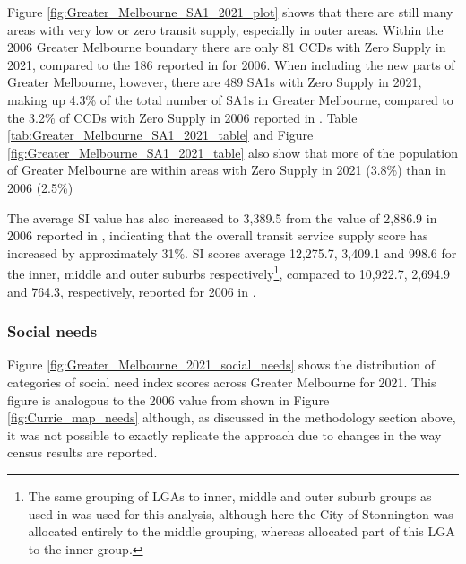 \documentclass[preprint, 3p,
authoryear]{elsarticle} %
\begin{document}
Figure \ref{fig:Greater_Melbourne_SA1_2021_plot} shows that there are
still many areas with very low or zero transit supply, especially in
outer areas. Within the 2006 Greater Melbourne boundary there are only
81 CCDs with Zero Supply in 2021, compared to the 186 reported in
\citet{currie2010identifying} for 2006. When including the new parts of
Greater Melbourne, however, there are 489 SA1s with Zero Supply in 2021,
making up 4.3\% of the total number of SA1s in Greater Melbourne,
compared to the 3.2\% of CCDs with Zero Supply in 2006 reported in
\citet{currie2010identifying}. Table
\ref{tab:Greater_Melbourne_SA1_2021_table} and Figure
\ref{fig:Greater_Melbourne_SA1_2021_table} also show that more of the
population of Greater Melbourne are within areas with Zero Supply in
2021 (3.8\%) than in 2006 (2.5\%)

The average SI value has also increased to 3,389.5 from the value of
2,886.9 in 2006 reported in \citet{currie2010identifying}, indicating
that the overall transit service supply score has increased by
approximately 31\%. SI scores average 12,275.7, 3,409.1 and 998.6 for
the inner, middle and outer suburbs respectively\footnote{The same
  grouping of LGAs to inner, middle and outer suburb groups as used in
  \citet{currie2010identifying} was used for this analysis, although
  here the City of Stonnington was allocated entirely to the middle
  grouping, whereas \citet{currie2010identifying} allocated part of this
  LGA to the inner group.}, compared to 10,922.7, 2,694.9 and 764.3,
respectively, reported for 2006 in \citet{currie2010identifying}.

\subsubsection{Social needs}\label{social-needs}

Figure \ref{fig:Greater_Melbourne_2021_social_needs} shows the
distribution of categories of social need index scores across Greater
Melbourne for 2021. This figure is analogous to the 2006 value from
\citet{currie2010identifying} shown in Figure \ref{fig:Currie_map_needs}
although, as discussed in the methodology section above, it was not
possible to exactly replicate the \citet{currie2010identifying} approach
due to changes in the way census results are reported.
\end{document}
